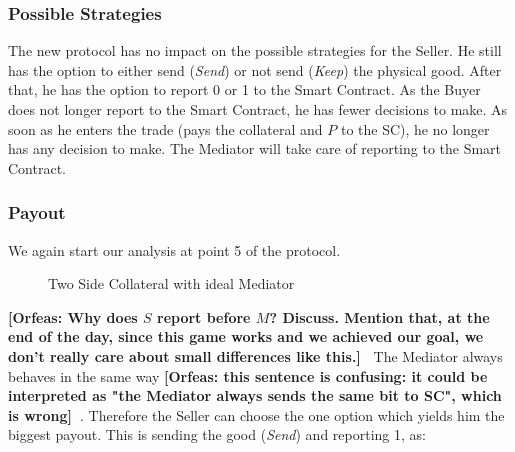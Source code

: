\documentclass{cacthesis}
\newcommand{\authnote}[3]{{ \footnotesize \textbf{#1[#2: #3]~}}}
\newcommand{\orfnote}[1]{\authnote{\color{blue}}{Orfeas}{#1}}
\begin{document}
\subsubsection{Possible Strategies}
The new protocol has no impact on the possible strategies for the Seller. He still has the option to either send (\emph{Send}) or not send (\emph{Keep}) the physical good. After that, he has the option to report 0 or 1 to the Smart Contract.\newline
As the Buyer does not longer report to the Smart Contract, he has fewer decisions to make. As soon as he enters the trade (pays the collateral and $P$ to the SC), he no longer has any decision to make. The Mediator will take care of reporting to the Smart Contract.

\subsubsection{Payout}
We again start our analysis at point 5 of the protocol.\newline

\begin{figure}[htb!]
    \centering
    \caption{Two Side Collateral with ideal Mediator}
\end{figure}

\orfnote{Why does $S$ report before $M$? Discuss. Mention that, at the end of
the day, since this game works and we achieved our goal, we don't really care
about small differences like this.}
The Mediator always behaves in the same way
\orfnote{this sentence is confusing: it could be interpreted as "the Mediator
always sends the same bit to SC", which is wrong}. Therefore the Seller can
choose the one option which yields him the biggest payout. This is sending the good (\emph{Send}) and reporting 1, as: 
\end{document}
